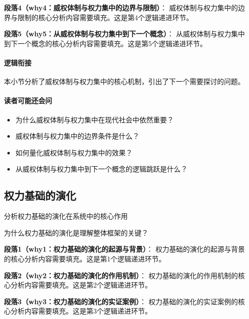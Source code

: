 \documentclass[../main.tex]{subfiles}
\begin{document}
\textbf{段落4（why4：威权体制与权力集中的边界与限制）}：
威权体制与权力集中的边界与限制的核心分析内容需要填充。这是第4个逻辑递进环节。


\textbf{段落5（why5：从威权体制与权力集中到下一个概念）}：
从威权体制与权力集中到下一个概念的核心分析内容需要填充。这是第5个逻辑递进环节。


\paragraph*{逻辑衔接}
本小节分析了威权体制与权力集中的核心机制，引出了下一个需要探讨的问题。

\paragraph*{读者可能还会问}
\begin{itemize}
\item 为什么威权体制与权力集中在现代社会中依然重要？
\item 威权体制与权力集中的边界条件是什么？
\item 如何量化威权体制与权力集中的效果？
\item 从威权体制与权力集中到下一个概念的逻辑跳跃是什么？
\end{itemize}


\subsection{权力基础的演化}

\begin{motivation}
分析权力基础的演化在系统中的核心作用
\end{motivation}

\begin{logicmap}
[逻辑链占位]
\end{logicmap}

\begin{questionbox}
为什么权力基础的演化是理解整体框架的关键？
\end{questionbox}

\textbf{段落1（why1：权力基础的演化的起源与背景）}：
权力基础的演化的起源与背景的核心分析内容需要填充。这是第1个逻辑递进环节。


\textbf{段落2（why2：权力基础的演化的作用机制）}：
权力基础的演化的作用机制的核心分析内容需要填充。这是第2个逻辑递进环节。


\textbf{段落3（why3：权力基础的演化的实证案例）}：
权力基础的演化的实证案例的核心分析内容需要填充。这是第3个逻辑递进环节。
\end{document}
